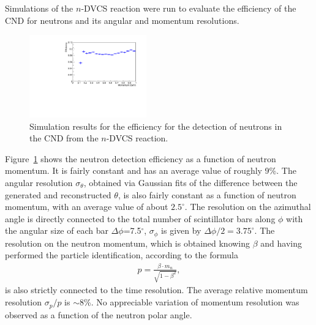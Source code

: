 Simulations of the $n$-DVCS reaction were run to evaluate the efficiency of the CND for neutrons and its angular and momentum resolutions. 
\begin{figure}[htb]  
\begin{center}
\includegraphics[width=0.45\textwidth]{Figure/canAtot.pdf}
\caption {Simulation results for the efficiency for the detection of neutrons in the CND from the $n$-DVCS reaction.}
\label{eff_vs_thr_mom}
\end{center}
\end{figure}
Figure~\ref{eff_vs_thr_mom} shows the neutron detection efficiency as a function of neutron momentum. It is fairly constant and has an average value of roughly 9\%.  
The angular resolution $\sigma_\theta$, obtained via Gaussian fits of the difference between the generated and reconstructed $\theta$, is also fairly constant as a function of neutron momentum, with an average value of about $2.5^\circ$. 
The resolution on the azimuthal angle is directly connected to the total number of scintillator bars along $\phi$ with the
angular size of each bar $\Delta\phi$=7.5$^{\circ}$, %
$\sigma_\phi$ is given by $\Delta\phi/2=3.75^\circ$.
The resolution on the neutron momentum, which is obtained knowing $\beta$ and having performed the particle identification, according to the formula
\begin{eqnarray}
p = \frac{\beta\cdot m_n}{\sqrt{1-\beta^2}},
\end{eqnarray}
is also strictly connected to the time resolution. The average relative momentum resolution $\sigma_p/p$ is $\sim$8\%. No appreciable variation of momentum resolution was observed as a function of the neutron polar angle. 

